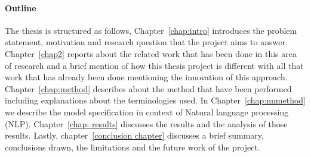 \paragraph{Outline}
The thesis is structured as follows, Chapter~\ref{chap:intro} introduces the problem statement, motivation and research question that the project aims to answer. Chapter~\ref{chap2} reports about the related work that has been done in this area of research and a brief mention of how this thesis project is different with all that work that has already been done mentioning the innovation of this approach. Chapter~\ref{chap:method} describes about the method that have been performed including explanations about the terminologies used. In Chapter~\ref{chap:nnmethod} we describe the model specification in context of Natural language processing (NLP). Chapter~\ref{chap: results} discusses the results and the analysis of those results. 
Lastly, chapter~\ref{conclusion chapter} discusses a brief summary, conclusions drawn, the limitations and the future work of the project. 
